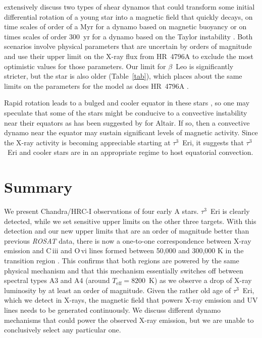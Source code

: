 \documentclass[preprint2]{aastex631}
\begin{document}
\citet{2014ApJ...786..136D} extensively discuss two types of shear
dynamos that could transform some initial differential rotation of a
young star into a magnetic field that quickly decays, on time scales
of order of a Myr for a dynamo based on magnetic buoyancy
\citep{1995MNRAS.272..528T} or on times scales of order 300~yr for a
dynamo based on the Taylor instability
\citep{2002A&A...381..923S,2006A&A...449..451B}. Both scenarios
involve physical parameters that are uncertain by orders of magnitude
and \citet{2014ApJ...786..136D} use their upper limit on the X-ray
flux from HR~4796A to exclude the most optimistic values for those
parameters. Our limit for $\beta$~Leo is significantly stricter, but
the star is also older (Table~\ref{tab}), which places about the same
limits on the parameters for the \citet{1995MNRAS.272..528T} model as
does HR~4796A \citep[See Fig 3 in][]{2014ApJ...786..136D}.

Rapid rotation leads to a bulged and cooler equator in these stars \citep[on Altair][resolved a temperature difference between pole and equator of at least 1000~K]{2007Sci...317..342M}, so one may speculate that some of the stars might be conducive to a convective instability near their equators as has been suggested by \citet{2009A&A...497..511R} for Altair. If so, then a convective dynamo near the equator may sustain significant levels of magnetic activity. Since the X-ray activity is becoming appreciable starting at $\tau^3$~Eri, it suggests that $\tau^3$~Eri and cooler stars are in an appropriate regime to host equatorial convection. 

\section{Summary}
\label{sec:summary}
We present Chandra/HRC-I observations of four early A stars. $\tau^3$~Eri is clearly detected, while we set sensitive upper limits on the other three targets. With this detection and our new upper limits that are an order of magnitude better than previous \emph{ROSAT} data, there is now a one-to-one correspondence between X-ray emission and C\,{\sc iii} and O\,{\sc vi} lines formed between 50,000 and 300,000 K in the transition region \citep{2002ApJ...579..800S}. This confirms that both regions are powered by the same physical mechanism and that this mechanism essentially switches off between spectral types A3 and A4 (around $T_\mathrm{eff}=8200$~K) as we observe a drop of X-ray luminosity by at least an order of magnitude. Given the rather old age of $\tau^3$~Eri, which we detect in X-rays, the magnetic field that powers X-ray emission and UV lines needs to be generated continuously. We discuss different dynamo mechanisms that could power the observed X-ray emission, but we are unable to conclusively select any particular one.
\end{document}
